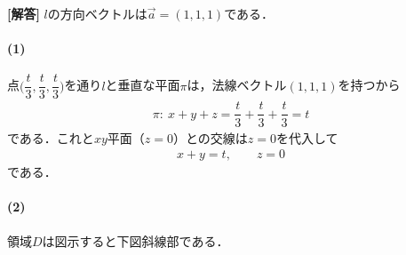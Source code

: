 \documentclass[../../main.tex]{subfiles}
\begin{document}
\begin{oframed}
  
\end{oframed}

{\bf [解答]}
$l$の方向ベクトルは$\vec a=(1,1,1)$である．

\paragraph{(1)}

点$\bigl(\dfrac{t}{3},\dfrac{t}{3},\dfrac{t}{3}\bigr)$を通り$l$と垂直な平面$\pi$は，法線ベクトル$(1,1,1)$を持つから
\begin{align}
  \pi:\ x+y+z=\dfrac{t}{3}+\dfrac{t}{3}+\dfrac{t}{3}=t
\end{align}
である．これと$xy$平面（$z=0$）との交線は$z=0$を代入して
\begin{align}
  x+y=t,\qquad z=0
\end{align}
である．

\paragraph{(2)}

領域$D$は図示すると下図斜線部である．
\end{document}
